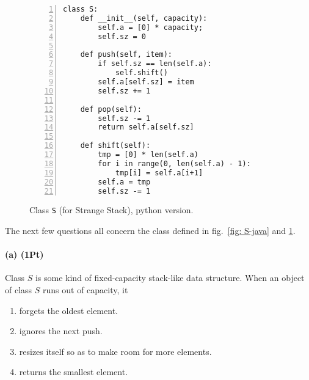 \documentclass{tufte-handout}
\begin{document}
  \begin{figure}
    \caption{\label{fig: S-python} Class {\tt S} (for Strange Stack), python version.}
    \begin{lstlisting}[basicstyle=\ttfamily,backgroundcolor=\color{white},
      frame=single,rulecolor=\color{gray!20},framesep=10pt,
      linewidth=12cm,numbers= left]
class S:
    def __init__(self, capacity):
        self.a = [0] * capacity;
        self.sz = 0

    def push(self, item):
        if self.sz == len(self.a):
            self.shift()
        self.a[self.sz] = item
        self.sz += 1

    def pop(self):
        self.sz -= 1
        return self.a[self.sz]

    def shift(self):
        tmp = [0] * len(self.a)
        for i in range(0, len(self.a) - 1):
            tmp[i] = self.a[i+1]
        self.a = tmp
        self.sz -= 1
      \end{lstlisting}
    \end{figure}
    
    The next few questions all concern the class defined in fig.~\ref{fig: S-java} and \ref{fig: S-python}.

    \paragraph*{(a) (1Pt)} Class $S$ is some kind of fixed-capacity stack-like data structure.
      When an object of class $S$ runs out of capacity, it
      \begin{enumerate}
      \item forgets the oldest element.\\
      \item ignores the next push.\\
      \item resizes itself so as to make room for more elements. \\ 
      \item returns the smallest element. \\
 
      \end{enumerate}

      \pagebreak
\end{document}
